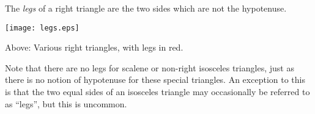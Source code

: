 \documentclass[12pt]{article}
\begin{document}
The {\it legs} of a right triangle are the two sides which are not the hypotenuse.

\begin{center}

\texttt{[image: legs.eps]}

{\tiny Above: Various right triangles, with legs in red. }

\end{center}

Note that there are no legs for scalene or non-right isosceles triangles, just as there is no notion of hypotenuse for these special triangles.  An exception to this is that the two equal sides of an isosceles triangle may occasionally be referred to as ``legs'', but this is uncommon.
\end{document}
